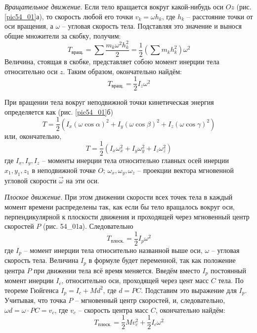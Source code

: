 \emph{Вращательное движение}. Если тело вращается вокруг какой-нибудь 
оси \( Oz \) (рис. \ref{pic54_01}а), то скорость любой его точки 
\( v_k = \omega h_k \), где \( h_k \) -- расстояние точки от оси вращения, 
а \( \omega \) -- угловая скорость тела. Подставляя это значение и вынося 
общие множители за скобку, получим:
\[ 
	T_{\text{вращ.}} = \sum\frac{m_k \omega^2 h^2_k}{2} = 
	\frac{1}{2}\left( \sum m_k h^2_k \right)\omega^2
\]
Величина, стоящая в скобке, представляет собою момент инерции тела 
относительно оси \( z \). Таким образом, окончательно найдём:
\[ T_{\text{вращ.}} = \frac{1}{2}I_z \omega^2 \]

При вращении тела вокруг неподвижной точки кинетическая энергия 
определяется как (рис. \ref{pic54_01}б)
\[ 
	T = \frac{1}{2}\left( I_x(\omega\cos\alpha)^2 + 
	I_y(\omega\cos\beta)^2 + I_z(\omega\cos\gamma)^2 \right) 
\]
или, окончательно, 
\[ 
	T = \frac{1}{2}\left( I_x\omega^2_x + I_y\omega^2_y + I_z\omega^2_z \right) 
\]
где \( I_x, I_y, I_z \) -- моменты инерции тела относительно главных 
осей инерции \( x_1, y_1, z_1 \) в неподвижной точке \( O \); 
\( \omega_x, \omega_y, \omega_z \) -- проекции вектора мгновенной 
угловой скорости \( \vec{\omega} \) на эти оси.

\emph{Плоское движение}. При этом движении скорости всех точек тела в 
каждый момент времени распределены так, как если бы тело вращалось 
вокруг оси, перпендикулярной к плоскости движения и проходящей через 
мгновенный центр скоростей \( P \) (рис. 54_01а). Следовательно 
\[ T_{\text{плоск.}} = \frac{1}{2}I_p \omega^2 \]
где \( I_p \) -- момент инерции тела относительно названной выше оси, 
\( \omega \) -- угловая скорость тела. Величина \( I_p \) в формуле 
будет переменной, так как положение центра \( P \) при движении тела 
всё время меняется. Введём вместо \( I_p \) постоянный момент инерции 
\( I_c \), относительно оси, проходящей через цент масс \( C \) 
тела. По теореме Гюйгенса \( I_p = I_c + Md^2 \), где \( d = PC \). 
Подставим это выражение для \( I_p \). Учитывая, что точка \( P \) -- 
мгновенный центр скоростей, и, следовательно, 
\( \omega d = \omega\cdot PC = v_c \), где \( v_c \) -- скорость 
центра масс \( C \), окончательно найдём:
\[ 
	T_{\text{плоск.}} = \frac{1}{2}Mv^2_c + 
	\frac{1}{2}I_c \omega^2
\]

\newpage
